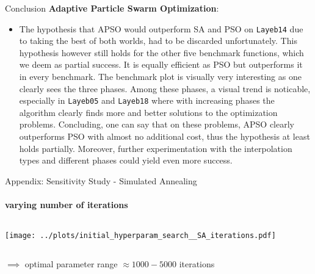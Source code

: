 \documentclass[11pt,aspectratio=169]{beamer}
\begin{document}
\begin{closingframe}{Conclusion}
    \textbf{Adaptive Particle Swarm Optimization}:
    \begin{itemize}
        \item The hypothesis that APSO would outperform SA and PSO on \texttt{Layeb14} due to taking the best of both worlds, had to be discarded unfortunately. This hypothesis however still holds for the other five benchmark functions, which we deem as partial success. It is equally efficient as PSO but outperforms it in every benchmark. The benchmark plot is visually very interesting as one clearly sees the three phases. Among these phases, a visual trend is noticable, especially in \texttt{Layeb05} and \texttt{Layeb18} where with increasing phases the algorithm clearly finds more and better solutions to the optimization problems. Concluding, one can say that on these problems, APSO clearly outperforms PSO with almost no additional cost, thus the hypothesis at least holds partially. Moreover, further experimentation with the interpolation types and different phases could yield even more success.
    \end{itemize}
\end{closingframe}

%
%

\begin{closingframe}{Appendix: Sensitivity Study - Simulated Annealing}
    \label{sec:sensitivity_study_sa_appendix}
    \framesubtitle{varying \textbf{number of iterations}}

    \begin{columns}
    \begin{column}{0.8\textwidth}
        \texttt{[image: ../plots/initial\_hyperparam\_search\_\_SA\_iterations.pdf]}
    \end{column}
    \end{columns}

    \begin{columns}
        \begin{column}{0.8\textwidth}
            $\implies$ optimal parameter range $\approx 1000-5000$ iterations
        \end{column}
        \begin{column}{0.1\textwidth}
            \tiny{}
        \end{column}
    \end{columns}

\end{closingframe}
\end{document}
